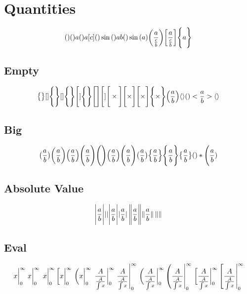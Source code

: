 \documentclass{article}
\begin{document}
\section*{Quantities}

\[
  \quantity
  \quantity a
  \quantity\bigg a
  \quantity[c]
  \quantity\sin
  \qty\Bigg ab
  \quantity\bigg\sin
  \qty(a)
  \qty(\frac{a}{\frac{c}{b}})
  \qty[\frac{a}{\frac{c}{b}}]
  \qty\Bigg{a}
\]

\subsection*{Empty}

\[
  \qty\big{}[]
  \qty\Bigg{}[]
  \qty\Bigg{}\Bigg[]
  \qty\Bigg{}\qty\Bigg[]
  \Bigg[]
  \Bigg[ \times \Bigg]
  \Biggl[ \times \Biggr]
  \qty\Bigg[\times]
  \qty\Bigg{\times}
  \qty(\frac{a}{b})\langle\rangle
  \qty<\frac{a}{b}>\langle\rangle
\]

\subsection*{Big}

\[
  \quantity\big(\frac{a}{b})
  \quantity\bigg(\frac{a}{b})
  \quantity\Big(\frac{a}{b})
  \quantity\Bigg(\frac{a}{b})
  \pqty\Bigg{} 
  \pqty{\frac{a}{b}}
  \pqty\Bigg{\frac{a}{b}}
  \pqty\big{\frac{a}{b}}
  \Bqty{\frac{a}{b}}
  \Bqty\Bigg{\frac{a}{b}}
  \Bqty\big{\frac{a}{b}}
  \quantity*\Bigg(\frac{a}{b})
\]

\subsection*{Absolute Value}
\[
  \absolutevalue\Bigg{\frac{a}{b}}
  \absolutevalue{}
  \abs\Bigg{\frac{a}{b}}
  \abs*\Bigg{\frac{a}{b}}
  \norm\Bigg{\frac{a}{b}}
  \norm*\Bigg{\frac{a}{b}}
  \norm{}
\]


\newpage
\subsection*{Eval}

\[
  \evaluated{x}_0^\infty
  \eval{x}_0^\infty
  \eval*{x}_0^\infty
  \eval[x|_0^\infty
  \eval*(x|_0^\infty
  \eval*{\frac{A}{\frac{A}{\int x}}}_0^\infty
  \eval{\frac{A}{\frac{A}{\int x}}}_0^\infty
  \eval*(\frac{A}{\frac{A}{\int x}}|_0^\infty
  \eval(\frac{A}{\frac{A}{\int x}}|_0^\infty
  \eval*[\frac{A}{\frac{A}{\int x}}|_0^\infty
  \eval[\frac{A}{\frac{A}{\int x}}|_0^\infty
\]
\end{document}
